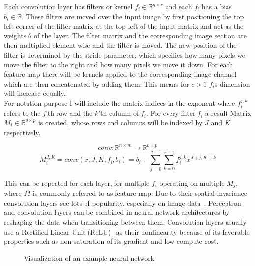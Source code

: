 \documentclass{article}
\begin{document}
\noindent Each convolution layer has filters or kernel $f_i \in \mathbb{R}^{q \times r}$ and each $f_i$ has a bias $b_i \in \mathbb{R}$.
These filters are moved over the input image by first positioning the top left corner of the filter matrix at the top left of the input matrix and act as the weights $\theta$ of the layer.
The filter matrix and the corresponding image section are then multiplied element-wise and
the filter is moved. The new position of the filter is determined by the stride parameter, which specifies how many pixels we move the filter to the right and how many pixels we move it down.
For each feature map there will be kernels applied to the corresponding image channel which are then concatenated by adding them. This means for $c > 1$ $f_i$s dimension will increase equally.\\
\noindent For notation purpose I will include the matrix indices in the exponent where $f_i^{j,k}$ refers
to the $j$'th row and the $k$'th column of $f_i$. For every filter $f_i$ a result Matrix $M_i \in \mathbb{R}^{o \times p}$ is created, whose rows and columns
will be indexed by $J$ and $K$ respectively. 

\begin{equation}
    conv: \mathbb{R}^{n \times m} \xrightarrow{} \mathbb{R}^{o \times p}
\end{equation}
\begin{equation*}
    M_i^{J, K} = conv(x, J, K; f_i, b_i) = b_i + \sum_{j=0}^{q-1} \sum_{k=0}^{r-1} f_i^{j,k} x^{J+j, K+k}
\end{equation*}

\noindent This can be repeated for each layer, for multiple $f_i$ operating on multiple $M_j$, where $M$ is commonly
referred to as feature map.
Due to their spatial invariance convolution layers see lots of popularity, especially on image data~\cite{DBLP:journals/corr/abs-2002-02959}. 
Perceptron and convolution layers can be combined in neural network architectures by reshaping the data when transitioning between them. Convolution layers usually use a Rectified Linear Unit (ReLU)~\cite{DBLP:journals/corr/abs-1803-08375} as their nonlinearity because of its favorable properties such as non-saturation of its gradient and low compute cost.\newline

\begin{figure}[htbp]
  \centering
  
  \caption{Visualization of an example neural network}
\end{figure}
\end{document}
